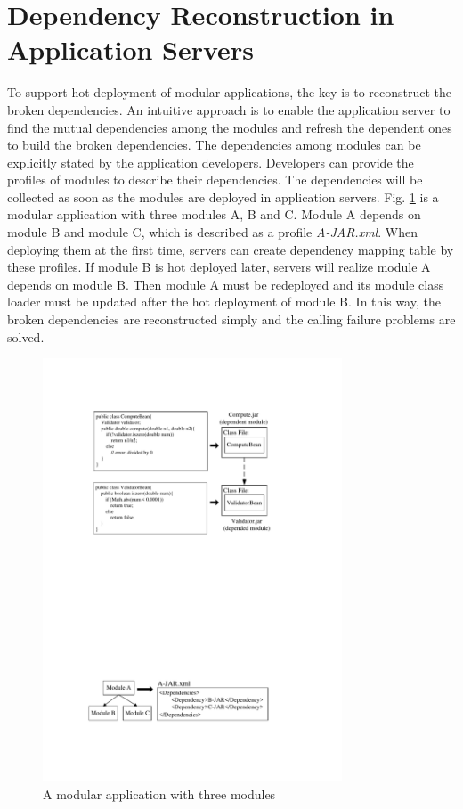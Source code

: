 \documentclass[conference]{IEEEtran}
\begin{document}
\section{Dependency Reconstruction in Application Servers\label{sec:reconstructionAS}}

To support hot deployment of modular applications, the key is to reconstruct the broken dependencies. An intuitive approach is to enable the application server to find the mutual dependencies among the modules and refresh the dependent ones to build the broken dependencies. The dependencies among modules can be explicitly stated by the application developers. Developers can provide the profiles of modules to describe their dependencies. The dependencies will be collected as soon as the modules are deployed in application servers. Fig. \ref{fig:example_abc} is a modular application with three modules A, B and C. Module A depends on module B and module C, which is described as a profile \emph{A-JAR.xml}. When deploying them at the first time, servers can create dependency mapping table by these profiles. If module B is hot deployed later, servers will realize module A depends on module B. Then module A must be redeployed and its module class loader must be updated after the hot deployment of module B. In this way, the broken dependencies are reconstructed simply and the calling failure problems are solved.

\begin{figure}[ht]
\centering
\includegraphics[width=3.5in]{ExampleThree.pdf}
\caption{A modular application with three modules}
\label{fig:example_abc}
\end{figure}
\end{document}
